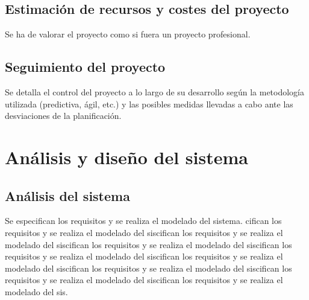 \documentclass[pdftex,11pt,a4paper]{book}
\begin{document}
\section{Estimación de recursos y costes del proyecto}

Se ha de valorar el proyecto como si fuera un proyecto profesional.

\section{Seguimiento del proyecto}

Se detalla el control del proyecto a lo largo de su desarrollo según la metodología utilizada (predictiva, ágil, etc.) y las posibles medidas llevadas a cabo ante las desviaciones de la planificación.





\chapter{Análisis y diseño del sistema}

\section{Análisis del sistema}

Se especifican los requisitos y se realiza el modelado del sistema. cifican los requisitos y se realiza el modelado del siscifican los requisitos y se realiza el modelado del siscifican los requisitos y se realiza el modelado del siscifican los requisitos y se realiza el modelado del siscifican los requisitos y se realiza el modelado del siscifican los requisitos y se realiza el modelado del siscifican los requisitos y se realiza el modelado del siscifican los requisitos y se realiza el modelado del sis.
\newpage



\renewcommand{\tablename}{Tabla}
\renewcommand{\arraystretch}{1,7}
\end{document}

